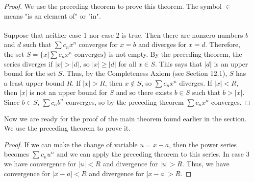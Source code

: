     \begin{proof}\let\qed\relax
      We use the preceding theorem to prove this theorem. The symbol $\in$ means "is an element of" or "in".\\~\\
      Suppose that neither case 1 nor case 2 is true. Then there are nonzero numbers $b$ and $d$ such that $\sum c_n x^n$ converges for $x=b$ and diverges for $x=d$. Therefore, the set $S = \{x | \sum c_n x^n \text{ converges}\}$ is not empty. By the preceding theorem, the series diverges if  $|x| > |d|$, so  $|x| \geq |d|$ for all $x \in S$. This says that $|d|$ is an upper bound for the set $S$. Thus, by the Completeness Axiom (see Section 12.1), $S$ has a least upper bound $R$. If  $|x| > R$, then $x \notin S$, so $\sum c_n x^n$ diverges. If $|x| < R$, then $|x|$ is not an upper bound for $S$ and so there exists $b \in S$ such that $b > |x|$. Since $b \in S$, $\sum c_n b^n$ converges, so by the preceding theorem $\sum c_n x^n$ converges.
    \end{proof}
    Now we are ready for the proof of the main theorem found earlier in the section. We use the preceding theorem to prove it.
    \begin{proof}\let\qed\relax
      If we can make the change of variable $u=x-a$, then the power series becomes  $\sum c_n u^n$  and we can apply the preceding theorem to this series. In case 3 we have convergence for $|u|<R$ and divergence for $|u|>R$. Thus, we have convergence for $|x-a|<R$ and divergence for $|x-a|>R$.
    \end{proof}


